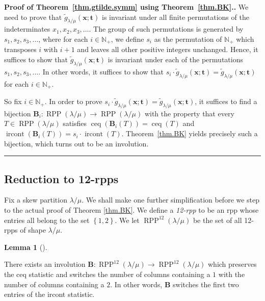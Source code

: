 \documentclass[numbers=enddot,12pt,final,onecolumn,notitlepage]{scrartcl}%
\theoremstyle{definition}
\newtheorem{lem}[theo]{Lemma}
\newenvironment{lemma}[1][]
{\begin{lem}[#1]\begin{leftbar}}
{\end{leftbar}\end{lem}}
\newenvironment{proof}[1][Proof]{\noindent\textbf{#1.} }{\ \rule{0.5em}{0.5em}}
\newcommand{\Nplus}{\mathbb{N}_{+}}
\def\ceq{{\operatorname{ceq}}}
\def\ircont{{\operatorname{ircont}}}
\def\t{{\mathbf{t}}}
\def\x{{\mathbf{x}}}
\def\lm{{\lambda/\mu}}
\def\OneTwoRPP{{\operatorname{RPP}^{12}\left(  \lambda/\mu\right)}}
\begin{document}
\begin{proof}[Proof of Theorem~\ref{thm.gtilde.symm} using
Theorem~\ref{thm.BK}.]
We need to prove that $\widetilde{g}_{\lambda/\mu}(\x;\t)$ is invariant
under all finite permutations of the indeterminates
$x_1, x_2, x_3, \ldots$. The group of such permutations is generated by
$s_1, s_2, s_3, \ldots$, where for each $i \in \Nplus$, we define $s_i$
as the permutation of $\Nplus$ which transposes $i$ with $i+1$ and
leaves all other positive integers unchanged. Hence, it suffices to
show that $\widetilde{g}_{\lambda/\mu}(\x;\t)$ is invariant under each
of the permutations $s_1, s_2, s_3, \ldots$. In other words, it suffices
to show that $s_i \cdot \widetilde{g}_{\lambda/\mu}(\x;\t)
= \widetilde{g}_{\lambda/\mu}(\x;\t)$ for each $i \in \Nplus$.

So fix $i \in \Nplus$. In order to prove
$s_i \cdot \widetilde{g}_{\lambda/\mu}(\x;\t)
= \widetilde{g}_{\lambda/\mu}(\x;\t)$, it suffices to find a bijection
$\mathbf{B}_{i}:\operatorname{RPP}\left(  \lambda/\mu\right)
\rightarrow\operatorname{RPP}\left(  \lambda/\mu\right)  $ with the
property that every $T \in \operatorname{RPP}\left(  \lambda/\mu\right)$
satisfies $\ceq\left(\mathbf{B}_i\left(T\right)\right) = \ceq \left(T\right)$ and
$\ircont\left(\mathbf{B}_i\left(T\right)\right) = s_i \cdot \ircont \left(T\right)$.
Theorem~\ref{thm.BK} yields precisely such a bijection, which turns out to be an involution.
\end{proof}

\subsection{Reduction to 12-rpps}

Fix a skew partition $\lm$. We shall make one further simplification before we step to the actual proof of
Theorem \ref{thm.BK}. We define a \textit{12-rpp} to be an rpp whose entries all belong to the set $\left\{  1,2\right\}  $. We let $\OneTwoRPP$ be the set of all 12-rpps of shape $\lm$.

\begin{lemma}
\label{lem.BK} There exists an
involution $\mathbf{B}:\OneTwoRPP\rightarrow\OneTwoRPP$
which preserves the ceq statistic and switches the number of columns containing a $1$ with the number of columns containing a $2$. In other words, $\mathbf{B}$ switches the first two entries of the ircont statistic.
\end{lemma}
\end{document}
